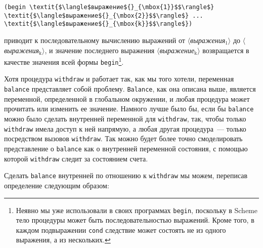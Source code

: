 \begin{Verbatim}[fontsize=\small]
(begin \textit{$\langle$выражение${}_{\mbox{1}}$$\rangle$} \textit{$\langle$выражение${}_{\mbox{2}}$$\rangle$} ... \textit{$\langle$выражение${}_{\mbox{k}}$$\rangle$})
\end{Verbatim}
приводит к последовательному вычислению выражений от
\textit{$\langle$выражения${}_{\mbox{1}}$$\rangle$} до
\textit{$\langle$выражения${}_{\mbox{k}}$$\rangle$}, и значение
последнего выражения
\textit{$\langle$выражение${}_{\mbox{k}}$$\rangle$} возвращается в
качестве значения всей формы
{\tt begin}\footnote{Неявно мы уже использовали в своих программах
{\tt begin}, поскольку в Scheme тело процедуры может быть
последовательностью выражений.  Кроме того, в каждом подвыражении
{\tt cond} следствие может состоять не
из одного выражения, а из нескольких.}.

Хотя процедура {\tt withdraw} и работает так, как мы
того хотели, переменная {\tt balance} представляет собой
проблему.  {\tt Balance}, как она описана выше, является
переменной, определенной в глобальном окружении, и любая процедура может
прочитать или изменить ее значение.  Намного лучше было бы,
если бы {\tt balance} можно было сделать внутренней
переменной для {\tt withdraw}, так, чтобы только
{\tt withdraw} имела доступ к ней напрямую, а любая
другая процедура~--- только посредством вызовов {\tt withdraw}.
Так можно будет более точно смоделировать представление о
{\tt balance} как о внутренней переменной состояния, с помощью
которой {\tt withdraw} следит за состоянием
счета.

Сделать {\tt balance} внутренней по отношению к
{\tt withdraw} мы можем, переписав определение следующим
образом:

